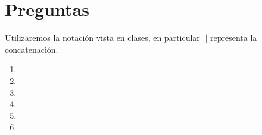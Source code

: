 \documentclass[11pt]{article}
\begin{document}



\section*{Preguntas}
Utilizaremos la notación vista en clases, en particular $||$ representa la concatenación.

\begin{enumerate}
    \item  \medskip

    \item  \medskip

    \item  \medskip

    \item  \medskip

    \item  \medskip

    \item 
\end{enumerate}
\end{document}
